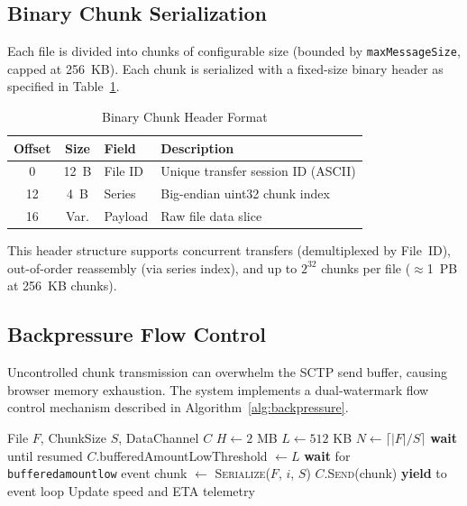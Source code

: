 \documentclass[conference]{IEEEtran}
\begin{document}
\subsection{Binary Chunk Serialization}
Each file is divided into chunks of configurable size (bounded by \texttt{maxMessageSize}, capped at 256~KB). Each chunk is serialized with a fixed-size binary header as specified in Table~\ref{tab:chunkformat}.

\begin{table}[htbp]
\caption{Binary Chunk Header Format}
\label{tab:chunkformat}
\centering
\begin{tabular}{@{}ccll@{}}
\toprule
\textbf{Offset} & \textbf{Size} & \textbf{Field} & \textbf{Description} \\
\midrule
0 & 12~B & File ID & Unique transfer session ID (ASCII) \\
12 & 4~B & Series & Big-endian uint32 chunk index \\
16 & Var. & Payload & Raw file data slice \\
\bottomrule
\end{tabular}
\end{table}

This header structure supports concurrent transfers (demultiplexed by File~ID), out-of-order reassembly (via series index), and up to $2^{32}$ chunks per file ($\approx$1~PB at 256~KB chunks).

\subsection{Backpressure Flow Control}
Uncontrolled chunk transmission can overwhelm the SCTP send buffer, causing browser memory exhaustion. The system implements a dual-watermark flow control mechanism described in Algorithm~\ref{alg:backpressure}.

\begin{algorithm}[htbp]
\caption{Backpressure-Aware Chunk Streaming}
\label{alg:backpressure}
\begin{algorithmic}[1]
\REQUIRE File $F$, ChunkSize $S$, DataChannel $C$
\STATE $H \leftarrow 2$ MB 
\STATE $L \leftarrow 512$ KB 
\STATE $N \leftarrow \lceil |F| / S \rceil$
        \STATE \textbf{wait} until resumed
    \ENDIF
        \STATE $C$.bufferedAmountLowThreshold $\leftarrow L$
        \STATE \textbf{wait} for \texttt{bufferedamountlow} event
    \ENDIF
    \STATE chunk $\leftarrow$ \textsc{Serialize}($F$, $i$, $S$)
    \STATE $C$.\textsc{Send}(chunk)
        \STATE \textbf{yield} to event loop
    \ENDIF
    \STATE Update speed and ETA telemetry
\ENDFOR
\end{algorithmic}
\end{algorithm}
\end{document}
